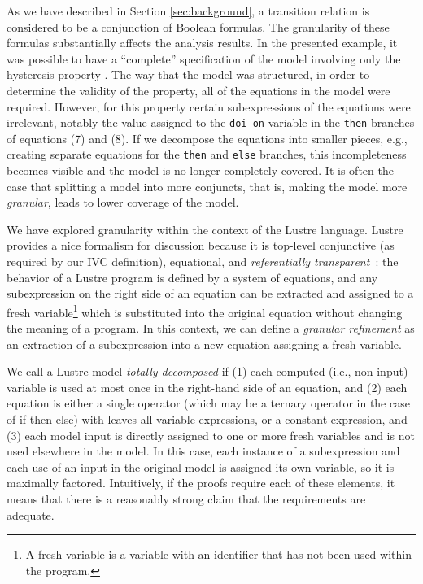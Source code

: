 As we have described in Section \ref{sec:background}, a transition relation is considered
to be a conjunction of Boolean formulas. The granularity of these formulas substantially affects the analysis results.  In the presented example, it was possible to have a ``complete'' specification of the model involving only the hysteresis property \hystp.  The way that the model was structured, in order to determine the validity of the property, all of the equations in the model were required.  However, for this property certain subexpressions of the equations were irrelevant, notably the value assigned to the \texttt{doi\_on} variable in the \texttt{then} branches of equations (7) and (8).  If we decompose the equations into smaller pieces, e.g., creating separate equations for the \texttt{then} and \texttt{else} branches, this incompleteness becomes visible and the model is no longer completely covered.  It is often the case that splitting a model into more conjuncts, that is, making the model more {\em granular}, leads to lower coverage of the model.



%
We have explored granularity within the context of the Lustre language.  Lustre provides a nice formalism for discussion because it is top-level conjunctive (as required by our IVC definition), equational, and {\em referentially transparent}~\cite{Halbwachs91:lustre}: the behavior of a Lustre program is defined by a system of equations, and any subexpression on the right side of an equation can be extracted and assigned to a fresh variable\footnote{A fresh variable is a variable with an identifier that has not been used within the program.} which is substituted into the original equation without changing the meaning of a program.  In this context, we can define a {\em granular refinement} as an extraction of a subexpression into a new equation assigning a fresh variable.

We call a Lustre model {\em totally decomposed} if (1) each computed (i.e., non-input) variable is used at most once in the right-hand side of an equation, and (2) each equation is either a single operator (which may be a ternary operator in the case of if-then-else) with leaves all variable expressions, or a constant expression, and (3) each model input is directly assigned to one or more fresh variables and is not used elsewhere in the model.  In this case, each instance of a subexpression and each use of an input in the original model is assigned its own variable, so it is maximally factored.  Intuitively, if the proofs require each of these elements, it means that there is a reasonably strong claim that the requirements are adequate.

